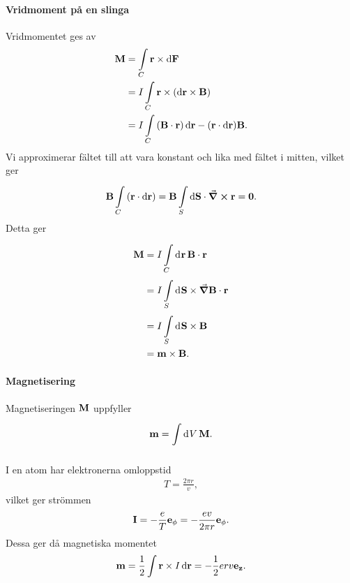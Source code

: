 \paragraph{Vridmoment på en slinga}
Vridmomentet ges av
\begin{align*}
	\vb{M} &= \int\limits_{C}{\vb{r}\times\dd{\vb{F}}} \\
	       &= I\int\limits_{C}{\vb{r}\times(\dd{\vb{r}}\times\vb{B})} \\
	       &= I\int\limits_{C}{(\vb{B}\cdot\vb{r})\dd{\vb{r}} - (\vb{r}\cdot\dd{\vb{r}})\vb{B}}.
\end{align*}
Vi approximerar fältet till att vara konstant och lika med fältet i mitten, vilket ger
\begin{align*}
	\vb{B}\int\limits_{C}{(\vb{r}\cdot\dd{\vb{r}})} = \vb{B}\int\limits_{S}^{}\dd{\vb{\vb{S}}}\cdot \curl{\vb{r}} = \vb{0}.
\end{align*}
Detta ger
\begin{align*}
	\vb{M} &= I\int\limits_{C}^{}\dd[]{\vb{r}}\vb{B}\cdot\vb{r} \\
	       &= I\int\limits_{S}^{}\dd[]{\vb{S}}\times\grad{\vb{B}\cdot\vb{r}} \\
	       &= I\int\limits_{S}^{}\dd[]{\vb{S}}\times\vb{B} \\
	       &= \vb{m}\times\vb{B}.
\end{align*}

\paragraph{Magnetisering}
Magnetiseringen $\vb{M}$ uppfyller
\begin{align*}
	\vb{m} = \int\limits_{}^{}\dd[]{V}\vb{M}.
\end{align*}

I en atom har elektronerna omloppstid
\begin{align*}
	T = \frac{2\pi r}{v},
\end{align*}
vilket ger strömmen
\begin{align*}
	\vb{I} = -\frac{e}{T}\vb{e}_{\vb{\phi}} = -\frac{ev}{2\pi r}\vb{e}_{\vb{\phi}}.
\end{align*}
Dessa ger då magnetiska momentet
\begin{align*}
	\vb{m} = \frac{1}{2}\int{\vb{r}\times I\dd{\vb{r}}} = -\frac{1}{2}erv\vb{e}_{\vb{z}}.
\end{align*}

